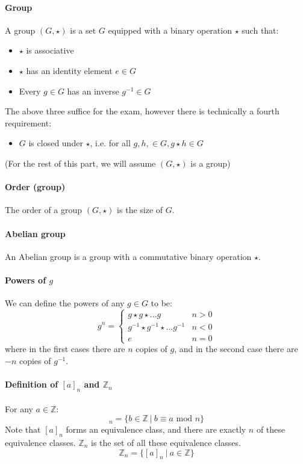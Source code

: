 \documentclass{article}
\newcommand{\Z}{\mathbb{Z}}
\begin{document}
\paragraph{Group}
A group $ (G, \star) $ is a set $ G $ equipped with a binary operation $ \star $ such that:
\begin{itemize}
\item $ \star $ is associative
\item $ \star $ has an identity element $ e \in G $
\item Every $ g \in G $ has an inverse $ g^{-1} \in G $
\end{itemize}
The above three suffice for the exam, however there is technically a fourth requirement:
\begin{itemize}
\item $ G $ is closed under $ \star $, i.e. for all $ g, h, \in G, g \star h \in G $
\end{itemize}
(For the rest of this part, we will assume $ (G, \star) $ is a group)
\paragraph{Order (group)}
The order of a group $ (G, \star) $ is the size of $ G $.
\paragraph{Abelian group}
An Abelian group is a group with a commutative binary operation $ \star $.
\paragraph{Powers of $ g $}
We can define the powers of any $ g \in G $ to be:
\begin{equation}
g^{n} = 
\begin{cases}
g \star g \star ... g & n > 0 \\
g^{-1} \star g^{-1} \star ... g^{-1} & n < 0 \\
e & n = 0
\end{cases}
\end{equation}
where in the first cases there are $ n $ copies of $ g $, and in the second case there are $ -n $ copies of $ g^{-1} $.
\paragraph{Definition of $ [a]_{n} $ and $ \Z_{n} $}
For any $ a \in \Z $:
\begin{equation}
[a]_{n} = \{b \in \Z \ | \ b \equiv a \textrm{ mod } n \}
\end{equation}
Note that $ [a]_{n} $ forms an equivalence class, and there are exactly $ n $ of these equivalence classes. $ \Z_{n} $ is the set of all these equivalence classes.
\begin{equation}
\Z_{n} = \{[a]_{n} \ | \ a \in \Z \}
\end{equation}
\end{document}

